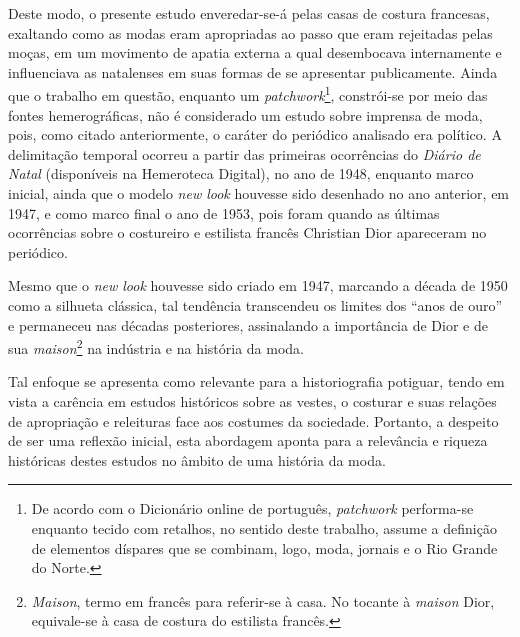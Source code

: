 \begin{refsection}
    Deste modo, o presente estudo enveredar-se-á pelas casas de costura francesas, exaltando como as modas eram apropriadas ao passo que eram rejeitadas pelas moças, em um movimento de apatia externa a qual desembocava internamente e influenciava as natalenses em suas formas de se apresentar publicamente. Ainda que o trabalho em questão, enquanto um \textit{patchwork}\footnote{De acordo com o Dicionário online de português, \textit{patchwork} performa-se enquanto tecido com retalhos, no sentido deste trabalho, assume a definição de elementos díspares que se combinam, logo, moda, jornais e o Rio Grande do Norte.}, constrói-se por meio das fontes hemerográficas, não é considerado um estudo sobre imprensa de moda, pois, como citado anteriormente, o caráter do periódico analisado era político. A delimitação temporal ocorreu a partir das primeiras ocorrências do \textit{Diário de Natal} (disponíveis na Hemeroteca Digital), no ano de 1948, enquanto marco inicial, ainda que o modelo \textit{new look} houvesse sido desenhado no ano anterior, em 1947, e como marco final o ano de 1953, pois foram quando as últimas ocorrências sobre o costureiro e estilista francês Christian Dior apareceram no periódico.

    Mesmo que o \textit{new look} houvesse sido criado em 1947, marcando a década de 1950 como a silhueta clássica, tal tendência transcendeu os limites dos ``anos de ouro'' e permaneceu nas décadas posteriores, assinalando a importância de Dior e de sua \textit{maison}\footnote{\textit{Maison}, termo em francês para referir-se à casa. No tocante à \textit{maison} Dior, equivale-se à casa de costura do estilista francês.} na indústria e na história da moda.

    Tal enfoque se apresenta como relevante para a historiografia potiguar, tendo em vista a carência em estudos históricos sobre as vestes, o costurar e suas relações de apropriação e releituras face aos costumes da sociedade. Portanto, a despeito de ser uma reflexão inicial, esta abordagem aponta para a relevância e riqueza históricas destes estudos no âmbito de uma história da moda.


\end{refsection}
